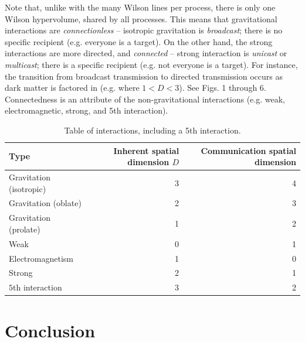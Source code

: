 \documentclass[12pt]{article}
\begin{document}
Note that, unlike with the many Wilson lines per process, there is only one Wilson hypervolume, shared by all processes.
This means that gravitational interactions are {\textit{connectionless}} -- isotropic gravitation is {\textit{broadcast}}; there is no specific recipient (e.g. everyone is a target).
On the other hand, the strong interactions are more directed, and {\textit{connected}} -- strong interaction is {\textit{unicast}} or {\textit{multicast}}; there is a specific recipient (e.g. not everyone is a target).
For instance, the transition from broadcast transmission to directed transmission occurs as dark matter is factored in (e.g. where $1 < D < 3$).
See Figs. 1 through 6.
Connectedness is an attribute of the non-gravitational interactions (e.g. weak, electromagnetic, strong, and 5th interaction).




\begin{table}
\caption{Table of interactions, including a 5th interaction.}
\begin{center}
\begin{tabular}{| l | r | r |}
  \hline
  Type & Inherent spatial dimension $D$ & Communication spatial dimension \\
\hline
\hline


Gravitation (isotropic) & 3  & 4\\

\rowcolor{Gray}
Gravitation (oblate) & 2 & 3\\

Gravitation (prolate) & 1 & 2\\

\rowcolor{Gray}
Weak & 0 & 1\\

Electromagnetism & 1 & 0 \\

\rowcolor{Gray}
Strong & 2 & 1\\

$5$th interaction & 3 & 2 \\
  \hline
\end{tabular}
\end{center}
\end{table}




\section{Conclusion}
\end{document}
